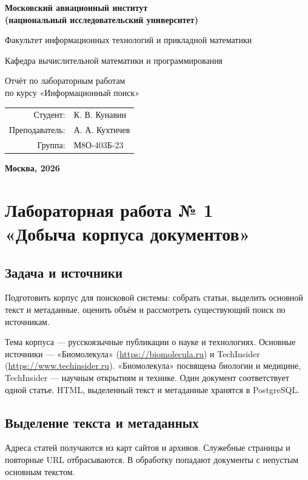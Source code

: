 \documentclass[12pt,a4paper]{article}
\renewcommand{\contentsname}{Содержание}
\renewcommand{\tablename}{Таблица}
\renewcommand{\figurename}{Рисунок}
\newcommand{\sub}[1]{\subsection{#1}}
\begin{document}
\renewcommand{\contentsname}{Содержание}
\renewcommand{\tablename}{Таблица}
\renewcommand{\figurename}{Рисунок}
\begin{titlepage}
\begin{center}\bfseries
{\Large Московский авиационный институт\\(национальный исследовательский университет)}
\vspace{18mm}

{\large Факультет информационных технологий и прикладной математики}
\vspace{12mm}

{\large Кафедра вычислительной математики и программирования}
\vspace{20mm}

{\large Отчёт по лабораторным работам\\по курсу «Информационный поиск»}
\vspace{8mm}

\end{center}
\vspace{24mm}
\begin{flushright}
\begin{tabular}{rl}
Студент: & К. В. Кунавин \\
Преподаватель: & А. А. Кухтичев \\
Группа: & М8О-403Б-23 \\
\end{tabular}
\end{flushright}
\vfill
\begin{center}\bfseries Москва, 2026\end{center}
\end{titlepage}
\tableofcontents
\clearpage
\section{Лабораторная работа № 1\\«Добыча корпуса документов»}
\sub{Задача и источники}
Подготовить корпус для поисковой системы: собрать статьи, выделить основной текст и метаданные, оценить объём и рассмотреть существующий поиск по источникам.

Тема корпуса --- русскоязычные публикации о науке и технологиях. Основные источники --- «Биомолекула» (\url{https://biomolecula.ru}) и TechInsider (\url{https://www.techinsider.ru}). «Биомолекула» посвящена биологии и медицине, TechInsider --- научным открытиям и технике. Один документ соответствует одной статье. HTML, выделенный текст и метаданные хранятся в PostgreSQL.
\sub{Выделение текста и метаданных}
Адреса статей получаются из карт сайтов и архивов. Служебные страницы и повторные URL отбрасываются. В обработку попадают документы с непустым основным текстом.
\end{document}
